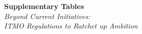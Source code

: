\documentclass[12pt,english]{article}
\begin{document}




%  


\clearpage
\renewcommand{\url}[1]{\href{#1}{Link}} %


\appendix

\renewcommand{\thetable}{A\arabic{table}}
\renewcommand{\thefigure}{A\arabic{figure}}
\setcounter{figure}{0}
\setcounter{table}{0}

\clearpage
\begin{center}
  \Large \textbf{Supplementary Tables} \\
  \Large \textit{Beyond Current Initiatives: \\
  ITMO Regulations to Ratchet up Ambition}
\end{center}
\end{document}
